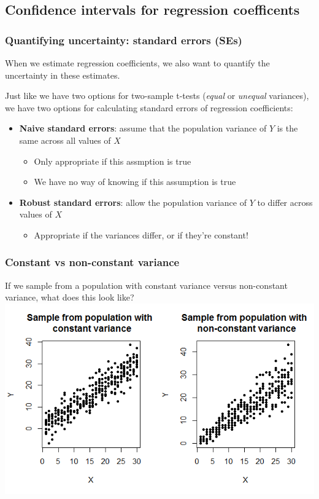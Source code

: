 \documentclass[12pt, 
hyperref={colorlinks=true, linkcolor=blue, urlcolor=cyan},dvipsnames]{beamer}
\begin{document}
\subsection{Confidence intervals for regression coefficents}
\begin{frame}
\frametitle{Quantifying uncertainty: standard errors (SEs)}

When we estimate regression coefficients, we also want to quantify the \color{blue} uncertainty \color{black} in these estimates.\vspace{-0.2cm} \pause

Just like we have two options for two-sample t-tests (\textit{equal} or \textit{unequal} variances), we have \color{blue} two options for calculating standard errors of regression coefficients\color{black}: \vspace{-0.3cm} \pause
\begin{itemize}
\item \textbf{Naive standard errors}: assume that the population variance of $Y$ is the same across all values of $X$ %
	\begin{itemize}
	\item Only appropriate if this assmption is true
	\item We have no way of knowing if this assumption is true
	\end{itemize}
\item \textbf{Robust standard errors}: allow the population variance of $Y$ to differ across values of $X$ %
	\begin{itemize}
	\item Appropriate if the variances differ, or if they're constant!
	\end{itemize}
\end{itemize}
\end{frame}

\begin{frame}
\frametitle{Constant vs non-constant variance}

If we sample from a population with constant variance versus non-constant variance, what does this look like?
\includegraphics[width=\textwidth]{./plots/hetero}

\end{frame}
\end{document}
